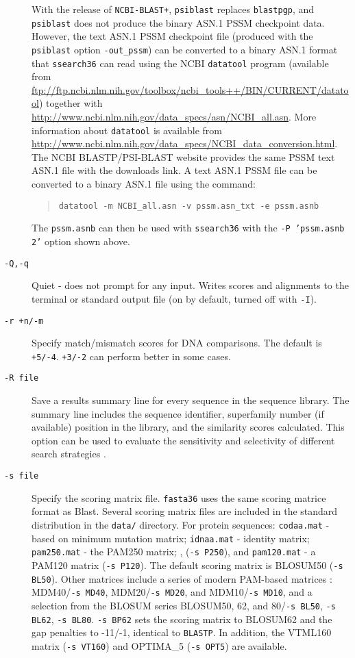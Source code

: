 \documentclass[11pt]{article}
\begin{document}
\begin{description}
With the release of \texttt{NCBI-BLAST+}, \texttt{psiblast} replaces
\texttt{blastpgp}, and \texttt{psiblast} does not produce the binary
ASN.1 PSSM checkpoint data.  However, the text ASN.1 PSSM checkpoint
file (produced with the \texttt{psiblast} option \texttt{-out\_pssm})
can be converted to a binary ASN.1 format that \texttt{ssearch36} can
read using the NCBI \texttt{datatool} program (available from
\url{ftp://ftp.ncbi.nlm.nih.gov/toolbox/ncbi_tools++/BIN/CURRENT/datatool})
together with
\url{http://www.ncbi.nlm.nih.gov/data_specs/asn/NCBI_all.asn}. More
information about \texttt{datatool} is available from
\url{http://www.ncbi.nlm.nih.gov/data_specs/NCBI_data_conversion.html}.
The NCBI BLASTP/PSI-BLAST website provides the same PSSM text ASN.1
file with the downloads link.  A text ASN.1 PSSM file can be converted
to a binary ASN.1 file using the command:
\begin{quote}
\texttt{datatool -m NCBI\_all.asn -v pssm.asn\_txt -e pssm.asnb}
\end{quote}
The \texttt{pssm.asnb} can then be used with
\texttt{ssearch36} with the \texttt{-P 'pssm.asnb 2'}
option shown above.

\item[\texttt{-Q,-q}]
Quiet - does not prompt for any input.  Writes scores and alignments
to the terminal or standard output file (on by default, turned off
with \texttt{-I}).
\item[\texttt{-r +n/-m}]
Specify match/mismatch scores for DNA comparisons.  The default is
\texttt{+5/-4}. \texttt{+3/-2} can perform better in some cases.
\item[\texttt{-R file}]
Save a results summary line for every sequence in the sequence
library.  The summary line includes the sequence identifier,
superfamily number (if available) position 
in the library, and the similarity scores calculated.  This option can
be used to evaluate the sensitivity and selectivity of different
search strategies \cite{wrp951,wrp981}.
\item[\texttt{-s file}] Specify the scoring matrix file.
  \texttt{fasta36} uses the same scoring matrice format as Blast.
  Several scoring matrix files are included in the standard
  distribution in the \texttt{data/} directory.  For protein
  sequences: \texttt{codaa.mat} - based on minimum mutation matrix;
  \texttt{idnaa.mat} - identity matrix; \texttt{pam250.mat} - the
  PAM250 matrix; \cite{day787}, (\texttt{-s P250}), and
  \texttt{pam120.mat} - a PAM120 matrix (\texttt{-s P120}).  The
  default scoring matrix is BLOSUM50 (\texttt{-s BL50}). Other
  matrices include a series of modern PAM-based matrices
  \cite{tay925}: MDM40/\texttt{-s MD40}, MDM20/\texttt{-s MD20}, and
  MDM10/\texttt{-s MD10}, and a selection from the BLOSUM series
  \cite{hen929} BLOSUM50, 62, and 80/\texttt{-s BL50}, \texttt{-s
    BL62}, \texttt{-s BL80}.  \texttt{-s BP62} sets the scoring matrix
  to BLOSUM62 and the gap penalties to -11/-1, identical to
  \texttt{BLASTP}.  In addition, the VTML160 matrix (\texttt{-s
    VT160}) \cite{muller2002} and OPTIMA\_5 (\texttt{-s OPT5})
  \cite{kan023} are available.


\end{description}
\end{document}
